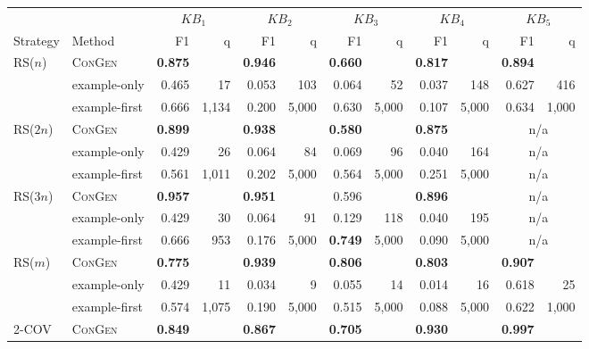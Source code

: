 \begin{tabular}{llrrrrrrrrrr}
\toprule
 &  & \multicolumn{2}{c}{$KB_1$} & \multicolumn{2}{c}{$KB_2$} & \multicolumn{2}{c}{$KB_3$} & \multicolumn{2}{c}{$KB_4$} & \multicolumn{2}{c}{$KB_5$} \\
\cmidrule(lr){3-4} \cmidrule(lr){5-6} \cmidrule(lr){7-8} \cmidrule(lr){9-10} \cmidrule(lr){11-12}
Strategy & Method & F1 & q & F1 & q & F1 & q & F1 & q & F1 & q \\
\midrule
\multirow{3}{*}{RS($n$)} & \textsc{ConGen} & \textbf{0.875} &  & \textbf{0.946} &  & \textbf{0.660} &  & \textbf{0.817} &  & \textbf{0.894} &  \\
 & example-only & 0.465 & 17 & 0.053 & 103 & 0.064 & 52 & 0.037 & 148 & 0.627 & 416 \\
 & example-first & 0.666 & 1{,}134 & 0.200 & 5{,}000 & 0.630 & 5{,}000 & 0.107 & 5{,}000 & 0.634 & 1{,}000 \\
\midrule
\multirow{3}{*}{RS($2n$)} & \textsc{ConGen} & \textbf{0.899} &  & \textbf{0.938} &  & \textbf{0.580} &  & \textbf{0.875} &  & \multicolumn{2}{c}{n/a} \\
 & example-only & 0.429 & 26 & 0.064 & 84 & 0.069 & 96 & 0.040 & 164 & \multicolumn{2}{c}{n/a} \\
 & example-first & 0.561 & 1{,}011 & 0.202 & 5{,}000 & 0.564 & 5{,}000 & 0.251 & 5{,}000 & \multicolumn{2}{c}{n/a} \\
\midrule
\multirow{3}{*}{RS($3n$)} & \textsc{ConGen} & \textbf{0.957} &  & \textbf{0.951} &  & 0.596 &  & \textbf{0.896} &  & \multicolumn{2}{c}{n/a} \\
 & example-only & 0.429 & 30 & 0.064 & 91 & 0.129 & 118 & 0.040 & 195 & \multicolumn{2}{c}{n/a} \\
 & example-first & 0.666 & 953 & 0.176 & 5{,}000 & \textbf{0.749} & 5{,}000 & 0.090 & 5{,}000 & \multicolumn{2}{c}{n/a} \\
\midrule
\multirow{3}{*}{RS($m$)} & \textsc{ConGen} & \textbf{0.775} &  & \textbf{0.939} &  & \textbf{0.806} &  & \textbf{0.803} &  & \textbf{0.907} &  \\
 & example-only & 0.429 & 11 & 0.034 & 9 & 0.055 & 14 & 0.014 & 16 & 0.618 & 25 \\
 & example-first & 0.574 & 1{,}075 & 0.190 & 5{,}000 & 0.515 & 5{,}000 & 0.088 & 5{,}000 & 0.622 & 1{,}000 \\
\midrule
\multirow{3}{*}{2-COV} & \textsc{ConGen} & \textbf{0.849} &  & \textbf{0.867} &  & \textbf{0.705} &  & \textbf{0.930} &  & \textbf{0.997} &  \\

\end{tabular}
